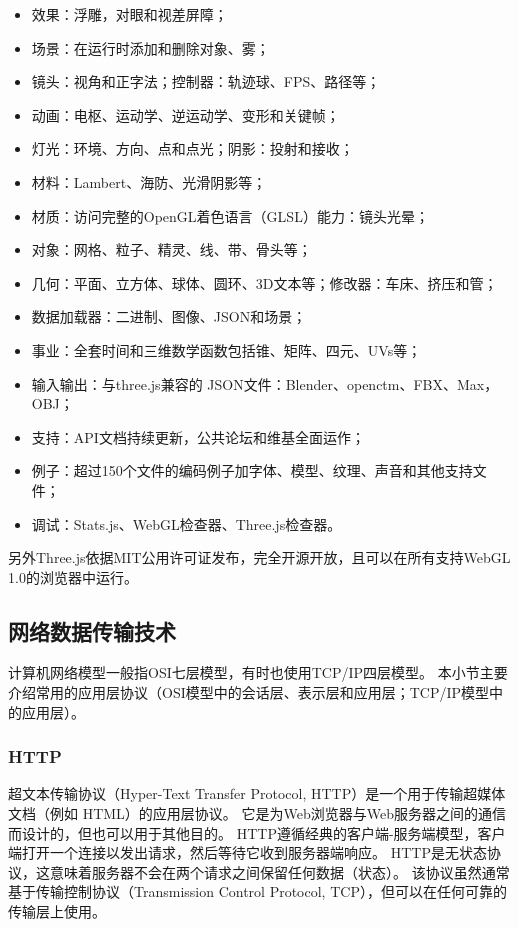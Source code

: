 \begin{itemize}
    \item 效果：浮雕，对眼和视差屏障；
    \item 场景：在运行时添加和删除对象、雾；
    \item 镜头：视角和正字法；控制器：轨迹球、FPS、路径等；
    \item 动画：电枢、运动学、逆运动学、变形和关键帧；
    \item 灯光：环境、方向、点和点光；阴影：投射和接收；
    \item 材料：Lambert、海防、光滑阴影等；
    \item 材质：访问完整的OpenGL着色语言（GLSL）能力：镜头光晕；
    \item 对象：网格、粒子、精灵、线、带、骨头等；
    \item 几何：平面、立方体、球体、圆环、3D文本等；修改器：车床、挤压和管；
    \item 数据加载器：二进制、图像、JSON和场景；
    \item 事业：全套时间和三维数学函数包括锥、矩阵、四元、UVs等；
    \item 输入输出：与three.js兼容的 JSON文件：Blender、openctm、FBX、Max，OBJ；
    \item 支持：API文档持续更新，公共论坛和维基全面运作；
    \item 例子：超过150个文件的编码例子加字体、模型、纹理、声音和其他支持文件；
    \item 调试：Stats.js、WebGL检查器、Three.js检查器。
\end{itemize}

另外Three.js依据MIT公用许可证发布，完全开源开放，且可以在所有支持WebGL 1.0的浏览器中运行。

\subsection{网络数据传输技术}
\label{sec:net}

计算机网络模型一般指OSI七层模型，有时也使用TCP/IP四层模型。
本小节主要介绍常用的应用层协议（OSI模型中的会话层、表示层和应用层；TCP/IP模型中的应用层）。

\subsubsection{HTTP}

超文本传输协议\cite{rfc7230}（Hyper-Text Transfer Protocol, HTTP）是一个用于传输超媒体文档（例如 HTML）的应用层协议。
它是为Web浏览器与Web服务器之间的通信而设计的，但也可以用于其他目的。
HTTP遵循经典的客户端-服务端模型，客户端打开一个连接以发出请求，然后等待它收到服务器端响应。
HTTP是无状态协议，这意味着服务器不会在两个请求之间保留任何数据（状态）。
该协议虽然通常基于传输控制协议\cite{rfc793}（Transmission Control Protocol, TCP），但可以在任何可靠的传输层上使用。

